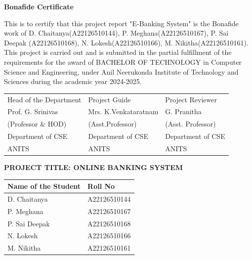 \begin{titlepage}
  \thispagestyle{empty}
  \begin{center}
    {\huge\bfseries Bonafide Certificate\par}
  \end{center}
  \vspace*{1cm}

  This is to certify that this project report "E-Banking System" is the Bonafide
  work of D. Chaitanya(A22126510144), P. Meghana(A22126510167), P. Sai Deepak
  (A22126510168), N. Lokesh(A22126510166), M. Nikitha(A22126510161).
  This project
  is carried out and is submitted in the partial fulfillment of the requirements
  for the award of BACHELOR OF TECHNOLOGY in Computer Science and Engineering,
  under Anil Neerukonda Institute of Technology and Sciences during the academic
  year 2024-2025.

  \vspace{1cm} %
  \begin{tabular}{lll}
    Head of the Department & Project Guide & Project Reviewer \\
    Prof. G. Srinivas & Mrs. K.Venkataratnam & G. Pranitha \\
    (Professor \& HOD) & (Asst.Professor) & (Asst. Professor) \\
    Department of CSE & Department of CSE & Department of CSE \\
    ANITS & ANITS & ANITS \\
  \end{tabular}

\end{titlepage}

\thispagestyle{empty}
\begin{center}
  \LARGE\textbf{PROJECT TITLE: ONLINE BANKING SYSTEM}\\
  \vspace{2cm}

  \begin{tabular}{|l|l|}
    \hline
    \textbf{Name of the Student} & \textbf{Roll No} \\
    \hline
    D. Chaitanya & A22126510144 \\
    \hline
    P. Meghana & A22126510167 \\
    \hline
    P. Sai Deepak & A22126510168 \\
    \hline
    N. Lokesh & A22126510166 \\
    \hline
    M. Nikitha & A22126510161 \\
    \hline
  \end{tabular}
\end{center}
\newpage


